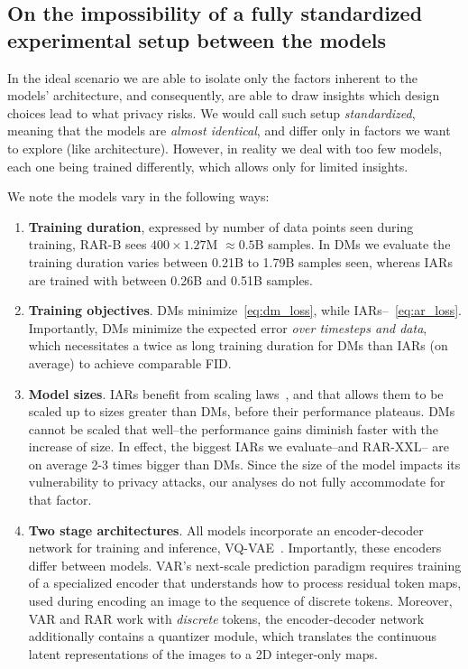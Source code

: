 \subsection{On the impossibility of a fully standardized experimental setup between the models}

{In the ideal scenario we are able to isolate only the factors inherent to the models' architecture, and consequently, are able to draw insights which design choices lead to what privacy risks. We would call such setup \textit{standardized}, meaning that the models are \textit{almost identical}, and differ only in factors we want to explore (like architecture). However, in reality we deal with too few models, each one being trained differently, which allows only for limited insights.}

{We note the models vary in the following ways:
\begin{enumerate}
    \item \textbf{Training duration}, expressed by number of data points seen during training, \eg RAR-B sees $400\times1.27$M $\approx0.5$B samples. In DMs we evaluate the training duration varies between 0.21B to 1.79B samples seen, whereas IARs are trained with between 0.26B and 0.51B samples.
    \item \textbf{Training objectives}. DMs minimize~\cref{eq:dm_loss}, while IARs--~\cref{eq:ar_loss}. Importantly, DMs minimize the expected error \textit{over timesteps and data}, which necessitates a twice as long training duration for DMs than IARs (on average) to achieve comparable FID.
    \item \textbf{Model sizes}. IARs benefit from scaling laws~\citep{kaplan2020scaling}, and that allows them to be scaled up to sizes greater than DMs, before their performance plateaus. DMs cannot be scaled that well--the performance gains diminish faster with the increase of size. In effect, the biggest IARs we evaluate--\varbig and RAR-XXL-- are on average 2-3 times bigger than DMs. Since the size of the model impacts its vulnerability to privacy attacks, our analyses do not fully accommodate for that factor.
    \item \textbf{Two stage architectures}. All models incorporate an encoder-decoder network for training and inference, \eg VQ-VAE~\citep{esser2020taming}. Importantly, these encoders differ between models. VAR's next-scale prediction paradigm requires training of a specialized encoder that understands how to process residual token maps, used during encoding an image to the sequence of discrete tokens. Moreover, VAR and RAR work with \textit{discrete} tokens, \ie the encoder-decoder network additionally contains a quantizer module, which translates the continuous latent representations of the images to a 2D integer-only maps.
\end{enumerate}}

